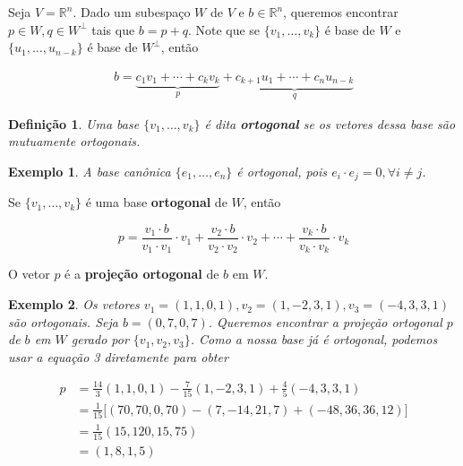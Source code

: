 \documentclass{article}
\newtheorem*{definition}{Definição}
\newtheorem*{example}{Exemplo}
\begin{document}
\par\vspace{0.3cm} Seja $V = \mathbb{R}^n$. Dado um subespaço $W$ de $V$ e $b\in\mathbb{R}^n$, queremos encontrar $p\in W, q\in W^{\perp}$ tais que $b = p+q$. Note que se $\{ v_1, \dots, v_k\}$ é base de $W$ e $\{ u_1, \dots, u_{n-k} \}$ é base de $W^{\perp}$, então 

\begin{align*}
b = \underbrace{c_1v_1 + \cdots + c_kv_k}_{p} + \underbrace{c_{k+1}u_1 + \cdots + c_nu_{n-k}}_{q}
\end{align*}

\begin{definition}
	Uma base $\{v_1, \dots, v_k\}$ é dita \textbf{ortogonal} se os vetores dessa base são mutuamente ortogonais.
\end{definition}

\begin{example}
	A base canônica $\{e_1, \dots, e_n\}$ é ortogonal, pois $e_i\cdot e_j = 0, \forall i\neq j$.
\end{example}

\par\vspace{0.3cm} Se $\{v_1, \dots, v_k\}$ é uma base \textbf{ortogonal} de $W$, então 

\begin{equation}
p = \frac{v_1\cdot b}{v_1\cdot v_1}\cdot v_1 + \frac{v_2\cdot b}{v_2\cdot v_2}\cdot v_2 + \cdots + \frac{v_k\cdot b}{v_k\cdot v_k}\cdot v_k
\end{equation}

\par\vspace{0.3cm} O vetor $p$ é a \textbf{projeção ortogonal} de $b$ em $W$.

\begin{example}
	Os vetores $v_1 = (1, 1, 0, 1), v_2 = (1, -2, 3, 1), v_3 = (-4, 3, 3, 1)$ são ortogonais. Seja $b = (0,7,0,7)$. Queremos encontrar a projeção ortogonal $p$ de $b$ em $W$ gerado por $\{v_1, v_2, v_3\}$. Como a nossa base já é ortogonal, podemos usar a equação 3 diretamente para obter
	
	\begin{align*}
	p &= \frac{14}{3}(1, 1, 0, 1) - \frac{7}{15}(1, -2, 3, 1) + \frac{4}{5}(-4, 3, 3, 1) \\
	&= \frac{1}{15}\Big[ (70,70,0,70) - (7, -14, 21, 7) + (-48, 36, 36, 12) \Big] \\
	&= \frac{1}{15}(15, 120, 15, 75) \\
	&= (1, 8, 1, 5)
	\end{align*}
	
\end{example}
\end{document}
